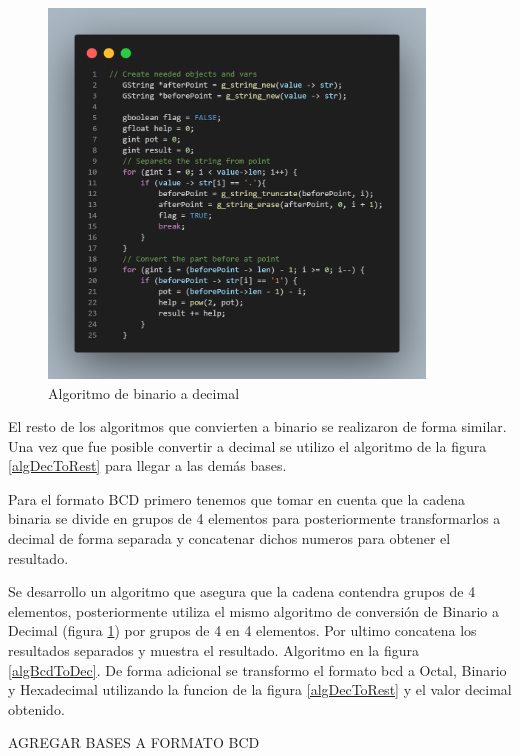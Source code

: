 \documentclass[letterpaper,12pt]{extarticle}%
\begin{document}
			\begin{figure}[H]
			\begin{center}
			\includegraphics[width=10cm]{imag//algBinToDec.png}
			\caption{Algoritmo de binario a decimal}
			\label{algBinToDec}
			\end{center}
			\end{figure}

			El resto de los algoritmos que convierten a binario se realizaron de forma similar. Una vez que fue
			posible convertir a decimal se utilizo el algoritmo de la figura \ref{algDecToRest} para llegar a las 
			demás bases.

			Para el formato BCD primero tenemos que tomar en cuenta que la cadena binaria se divide en grupos de 
			4 elementos para posteriormente transformarlos a decimal de forma separada y concatenar dichos numeros para 
			obtener el resultado.

			Se desarrollo un algoritmo que asegura que la cadena contendra grupos de 4 elementos, posteriormente utiliza 
			el mismo algoritmo de conversión de Binario a Decimal (figura \ref{algBinToDec}) por grupos de 4 en 4 elementos.
			Por ultimo concatena los resultados separados y muestra el resultado. Algoritmo en la figura \ref{algBcdToDec}.
			De forma adicional se transformo el formato bcd a Octal, Binario y Hexadecimal utilizando la funcion de la figura 
			\ref{algDecToRest} y el valor decimal obtenido.


			AGREGAR BASES A FORMATO BCD
\end{document}
